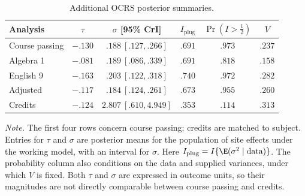\begin{table}[!t]
\caption{Additional OCRS posterior summaries.}
\label{tab:G-ocrs-ancillary}
\centering
\begin{tablebody}
\begin{tabular}{@{}lccccc@{}}
\toprule
Analysis & $\tau$ & $\sigma$ [95\% CrI] & $I_{\mathrm{plug}}$ & $\Pr(I>\tfrac12)$ & $V$ \\
\midrule
Course passing & $-.130$ & $.188\ [.127,.266]$ & $.691$ & $.973$ & $.237$ \\
\addlinespace[5pt]
Algebra 1 & $-.081$ & $.189\ [.086,.339]$ & $.691$ & $.818$ & $.158$ \\
\addlinespace[5pt]
English 9 & $-.163$ & $.203\ [.122,.318]$ & $.740$ & $.972$ & $.282$ \\
\addlinespace[5pt]
Adjusted & $-.117$ & $.184\ [.124,.261]$ & $.673$ & $.955$ & $.260$ \\
\addlinespace[9pt]
Credits & $-.124$ & $2.807\ [.610,4.949]$ & $.353$ & $.114$ & $.313$ \\
\bottomrule
\end{tabular}
\end{tablebody}
\par\vspace{0.4\baselineskip}
\begin{minipage}{\linewidth}\normalsize\doublespacing\raggedright
\textit{Note.} The first four rows concern course passing; credits are matched to subject. Entries for $\tau$ and $\sigma$ are posterior means for the population of site effects under the working model, with an interval for $\sigma$. Here $I_{\mathrm{plug}}=I\{\E(\sigma^2\mid\text{data})\}$. The probability column also conditions on the data and supplied variances, under which $V$ is fixed. Both $\tau$ and $\sigma$ are expressed in outcome units, so their magnitudes are not directly comparable between course passing and credits.
\end{minipage}
\end{table}
